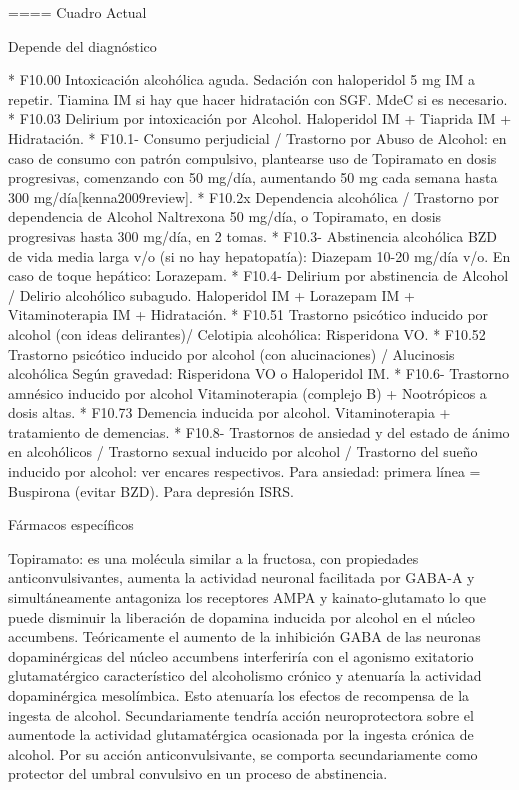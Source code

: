 \documentclass[encares.tex]{subfiles}
\begin{document}
==== Cuadro Actual

Depende del diagnóstico

* F10.00 Intoxicación alcohólica aguda. Sedación con haloperidol 5 mg IM a repetir. Tiamina IM si hay que hacer hidratación con SGF. MdeC si es necesario.
* F10.03 Delirium por intoxicación por Alcohol. Haloperidol IM + Tiaprida IM + Hidratación.
* F10.1- Consumo perjudicial / Trastorno por Abuso de Alcohol: en caso de consumo con patrón compulsivo, plantearse uso de Topiramato en dosis progresivas, comenzando con 50 mg/día, aumentando 50 mg cada semana hasta 300 mg/día[kenna2009review].
* F10.2x Dependencia alcohólica / Trastorno por dependencia de Alcohol Naltrexona 50 mg/día, o Topiramato, en dosis progresivas hasta 300 mg/día, en 2 tomas.
* F10.3- Abstinencia alcohólica BZD de vida media larga v/o (si no hay hepatopatía): Diazepam 10-20 mg/día v/o. En caso de toque hepático: Lorazepam.
* F10.4- Delirium por abstinencia de Alcohol / Delirio alcohólico subagudo. Haloperidol IM + Lorazepam IM + Vitaminoterapia IM + Hidratación.
* F10.51 Trastorno psicótico inducido por alcohol (con ideas delirantes)/ Celotipia alcohólica: Risperidona VO.
* F10.52 Trastorno psicótico inducido por alcohol (con alucinaciones) / Alucinosis alcohólica Según gravedad: Risperidona VO o Haloperidol IM.
* F10.6- Trastorno amnésico inducido por alcohol Vitaminoterapia (complejo B) + Nootrópicos a dosis altas.
* F10.73 Demencia inducida por alcohol. Vitaminoterapia + tratamiento de demencias.
* F10.8- Trastornos de ansiedad y del estado de ánimo en alcohólicos / Trastorno sexual inducido por alcohol / Trastorno del sueño inducido por alcohol: ver encares respectivos. Para ansiedad: primera línea = Buspirona (evitar BZD). Para depresión ISRS.

Fármacos específicos

Topiramato: es una molécula similar a la fructosa, con propiedades anticonvulsivantes, aumenta la actividad neuronal facilitada por GABA-A y simultáneamente antagoniza los receptores AMPA y kainato-glutamato lo que puede disminuir la liberación de dopamina inducida por alcohol en el núcleo accumbens. Teóricamente el aumento de la inhibición GABA de las neuronas dopaminérgicas del núcleo accumbens interferiría con el agonismo exitatorio glutamatérgico característico del alcoholismo crónico y atenuaría la actividad dopaminérgica mesolímbica. Esto atenuaría los efectos de recompensa de la ingesta de alcohol. Secundariamente tendría acción neuroprotectora sobre el aumentode la actividad glutamatérgica ocasionada por la ingesta crónica de alcohol. Por su acción anticonvulsivante, se comporta secundariamente como protector del umbral convulsivo en un proceso de abstinencia.
\end{document}

